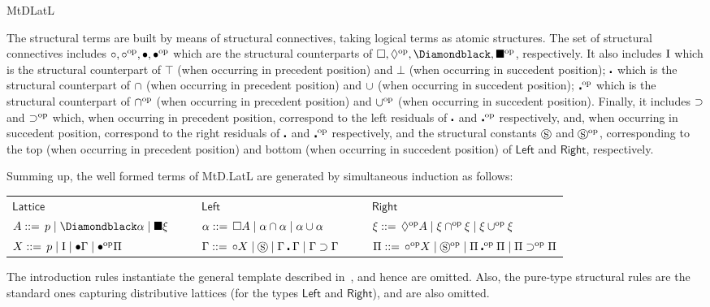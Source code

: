 \begin{entry}{MtDLatL}
\begin{clarifications}
  The structural terms are built by means of structural connectives, taking
  logical terms as atomic structures. The set of structural connectives includes
  $\circ, \circ^\mathrm{op}, \bullet, \bullet^\mathrm{op}$   which are the structural counterparts of
  $\pwbox, \diawp, \pbdiabp, \boxbp$, respectively.  It also includes $\textrm{I}$
  which is the structural counterpart of $\top$ (when occurring in precedent
  position) and $\bot$ (when occurring in succedent position); $\centerdot$ which is
  the structural counterpart of $\cap$ (when occurring in precedent position) and
  $\cup $ (when occurring in succedent position); $\centerdot^\mathrm{op}$ which is the
  structural counterpart of $\cap^\mathrm{op}$ (when occurring in precedent position) and
  $\cup^\mathrm{op} $ (when occurring in succedent position). Finally, it includes $\supset$ and
  $\supset^\mathrm{op}$ which, when occurring in precedent position, correspond to the left
  residuals of $\centerdot$ and $\centerdot^\mathrm{op}$ respectively,  and, when occurring in
  succedent position, correspond to the right residuals of $\centerdot$ and $\centerdot^\mathrm{op}$
  respectively, and the structural constants  $\circledS$ and $\circledS^\mathrm{op}$,
  corresponding to the top (when occurring in precedent position) and bottom (when
  occurring in succedent position) of $\mathsf{Left}$ and $\mathsf{Right}$,
  respectively.
  
  Summing up, the well formed terms of MtD.LatL are generated by simultaneous
  induction as follows:
  \begin{center}
  \begin{tabular}{lll}
  $\mathsf{Lattice}$ \ \ \ &
  $\mathsf{Left}$ \ \ \ &
  $\mathsf{Right}$ \\
  
  $A ::= \,p \mid \pbdiabp \alpha \mid \bboxb \xi$ \ \ \ &
  $\alpha     ::= \, \Box A \mid \alpha \cap \alpha \mid \alpha \cup \alpha$ \ \ \ &
  $\xi     ::= \, \Diamond^\mathrm{op} A \mid \xi \cap^\mathrm{op} \xi \mid \xi \cup^\mathrm{op} \xi$ \\
  
  $X ::= \, p \mid \textrm{I} \mid \bullet \Gamma \mid \bullet^{\mathrm{op}} \Pi$ \ \ \ &
  $\Gamma ::= \, \circ X \mid \circledS \mid \Gamma \centerdot \Gamma \mid \Gamma\supset \Gamma$ \ \ \ &
  $\Pi ::= \, \circ^\mathrm{op} X \mid \circledS^\mathrm{op} \mid \Pi \centerdot^\mathrm{op} \Pi \mid \Pi \supset^\mathrm{op} \Pi$ \\
  \end{tabular}
  \end{center}
  
  The introduction rules instantiate the general template described
  in~, and hence are omitted. Also, the pure-type structural rules are
  the standard ones capturing distributive lattices (for the types $\mathsf{Left}$
  and $\mathsf{Right}$), and are also omitted.
\end{clarifications}


\end{entry}
